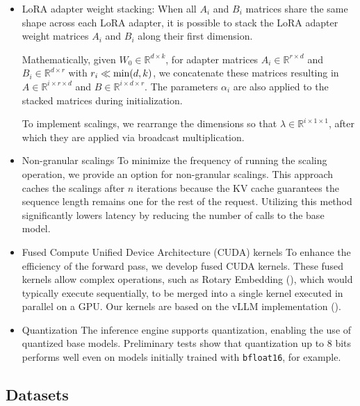 \begin{itemize}
    \item LoRA adapter weight stacking: When all $A_i$ and $B_i$ matrices share the same shape across each LoRA adapter, it is possible to stack the LoRA adapter weight matrices $A_i$ and $B_i$ along their first dimension.

Mathematically, given $W_0 \in \mathbb{R}^{d \times k}$, for adapter matrices $A_i \in \mathbb{R}^{r \times d}$ and $B_i \in \mathbb{R}^{d \times r}$ with $r_i \ll {\rm min} (d,k)$, we concatenate these matrices resulting in $A\in \mathbb{R}^{i \times r \times d}$ and $B\in \mathbb{R}^{i \times d \times r}$. The parameters $\alpha_i$ are also applied to the stacked matrices during initialization.

To implement scalings, we rearrange the dimensions so that $\lambda \in \mathbb{R}^{i \times 1 \times 1}$, after which they are applied via broadcast multiplication.

\item Non-granular scalings To minimize the frequency of running the scaling operation, we provide an option for non-granular scalings. This approach caches the scalings after $n$ iterations because the KV cache guarantees the sequence length remains one for the rest of the request. Utilizing this method significantly lowers latency by reducing the number of calls to the base model.

\item Fused Compute Unified Device Architecture (CUDA) kernels To enhance the efficiency of the forward pass, we develop fused CUDA kernels. These fused kernels allow complex operations, such as Rotary Embedding (\cite{su2021roformer}), which would typically execute sequentially, to be merged into a single kernel executed in parallel on a GPU. Our kernels are based on the vLLM implementation (\cite{kwon2023efficient}).

\item Quantization The inference engine supports quantization, enabling the use of quantized base models. Preliminary tests show that quantization up to 8 bits performs well even on models initially trained with \texttt{bfloat16}, for example.

\end{itemize}

\subsection{Datasets}

